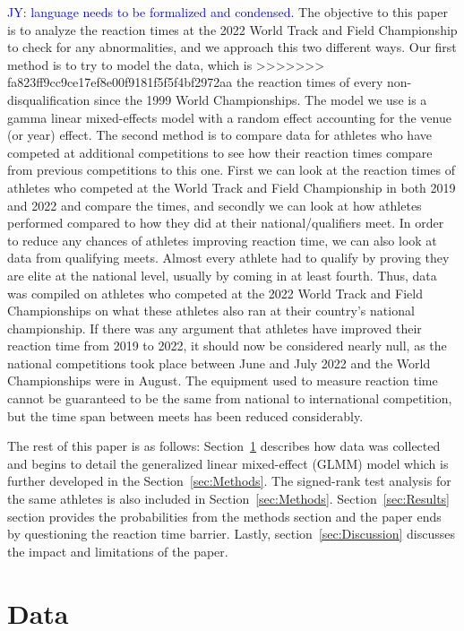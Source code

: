 \documentclass[12pt, letterpaper, titlepage]{article}
\newcommand{\jy}[1]{\textcolor{blue}{JY: #1}}
\begin{document}
\jy{language needs to be formalized and condensed.}
The objective to this paper is to analyze the reaction times at the 2022
World Track and Field Championship to check for any abnormalities, and we approach
this two different ways.  Our first method is to try to model the data, which is
>>>>>>> fa823ff9cc9ce17ef8e00f9181f5f5f4bf2972aa
the reaction times of every non-disqualification since the 1999 World Championships. 
The model we use is a gamma linear mixed-effects model with a random effect
accounting for the venue (or year) effect. 
The second method is to compare data for athletes who have competed
at additional competitions to see how their reaction times compare from previous
competitions to this one. First we can look at the reaction times of athletes who
competed at the World Track and Field Championship in both 2019 and 2022 and
compare the times, and secondly we can look at how athletes performed compared
to how they did at their national/qualifiers meet. In order to reduce any chances
of athletes improving reaction time, we can also look at data from qualifying meets.
Almost every athlete had to qualify by proving they are elite at the national level, 
usually by coming in at least fourth. Thus, data was compiled on athletes who competed
at the 2022 World Track and Field Championships on what these athletes also ran 
at their country's national championship. If there was any argument that athletes
have improved their reaction time from 2019 to 2022, it should now be considered
nearly null, as the national competitions took place between June and July 2022 
and the World Championships were in August. The equipment used to measure reaction
time cannot be guaranteed to be the same from national to international
competition, but the time span between meets has been reduced considerably.


The rest of this paper is as follows: Section~\ref{sec:Data} describes how data was
collected and begins to detail the generalized linear mixed-effect (GLMM)
model which is further developed in the
Section~\ref{sec:Methods}.  The signed-rank test analysis for the same athletes is
also included in Section~\ref{sec:Methods}.  Section~\ref{sec:Results}
section provides the probabilities from the methods section and the paper ends 
by questioning the reaction time barrier.  Lastly, section~\ref{sec:Discussion}
discusses the impact and limitations of the paper.


\section{Data} \label{sec:Data}
\end{document}
